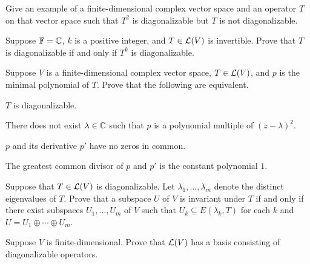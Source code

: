 \begin{exc}
\begin{exercise}\leavevmode
\begin{parts}
\item Give an example of a finite-dimensional complex vector space and an
  operator $T$ on that vector space such that $T^2$ is diagonalizable but $T$ is
  not diagonalizable.
\item Suppose $\mathbb{F}=\mathbb{C}$, $k$ is a positive integer, and $T\in\mathcal{L}(V)$ is
  invertible. Prove that $T$ is diagonalizable if and only if $T^k$ is
  diagonalizable.
\end{parts}
\end{exercise}

\begin{exercise}
Suppose $V$ is a finite-dimensional complex vector space, $T\in\mathcal{L}(V)$, and $p$
is the minimal polynomial of $T$. Prove that the following are equivalent.
\begin{parts}
\item $T$ is diagonalizable.
\item There does not exist $\lambda\in\mathbb{C}$ such that $p$ is a polynomial multiple
  of $(z-\lambda)^2$.
\item $p$ and its derivative $p'$ have no zeros in common.
\item The greatest common divisor of $p$ and $p'$ is the constant polynomial $1$.
\end{parts}
\end{exercise}

\begin{exercise}
Suppose that $T\in\mathcal{L}(V)$ is diagonalizable. Let $\lambda_1,\dots,\lambda_m$
denote the distinct eigenvalues of $T$. Prove that a subspace $U$ of $V$ is
invariant under $T$ if and only if there exist subspaces $U_1,\dots,U_m$ of $V$
such that $U_k\subseteq E(\lambda_k,T)$ for each $k$ and
$U=U_1\oplus\cdots\oplus U_m$.
\end{exercise}

\begin{exercise}
Suppose $V$ is finite-dimensional. Prove that $\mathcal{L}(V)$ has a basis consisting of
diagonalizable operators.
\end{exercise}


\end{exc}
